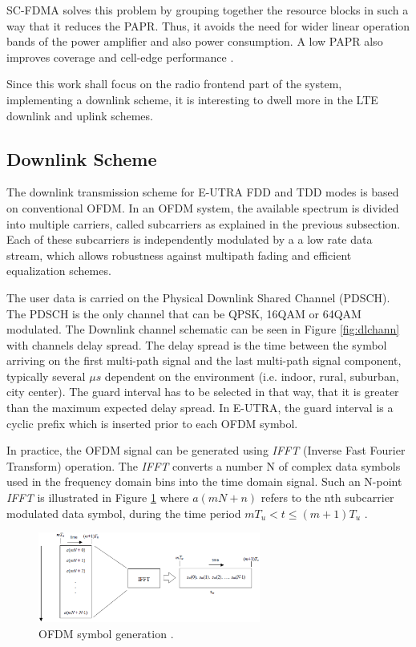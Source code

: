 SC-FDMA solves this problem by grouping together the resource blocks in such a
way that it reduces the PAPR. Thus, it avoids the need for wider linear
operation bands of the power amplifier and also power consumption. A low PAPR
also improves coverage and cell-edge performance \cite{introlte}.

Since this work shall focus on the radio frontend part of the system, implementing
a downlink scheme, it is interesting to dwell more in the LTE downlink and uplink
schemes.

\subsection{Downlink Scheme}%

The downlink transmission scheme for E-UTRA FDD and TDD modes is based on
conventional OFDM. In an OFDM system, the available spectrum is divided into
multiple carriers, called subcarriers as explained in the previous subsection.
Each of these subcarriers is independently modulated by a a low rate data
stream, which allows robustness against multipath fading and efficient
equalization schemes.

The user data is carried on the Physical Downlink Shared Channel (PDSCH). The
PDSCH is the only channel that can be QPSK, 16QAM or 64QAM modulated. The
Downlink channel schematic can be seen in Figure \ref{fig:dlchann} with channels
delay spread. The delay spread is the time between the symbol arriving on the
first multi-path signal and the last multi-path signal component, typically
several $\mu s$ dependent on the environment (i.e. indoor, rural, suburban, city
center). The guard interval has to be selected in that way, that it is greater
than the maximum expected delay spread. In E-UTRA, the guard interval is a
cyclic prefix which is inserted prior to each OFDM symbol.

In practice, the OFDM signal can be generated using \textit{IFFT} (Inverse Fast
Fourier Transform) operation. The \textit{IFFT} converts a number N of complex
data symbols used in the frequency domain bins into the time domain signal. Such
an N-point \textit{IFFT} is illustrated in Figure \ref{fig:ofdmsymbol} where
$a(mN+n)$ refers to the nth subcarrier modulated data symbol, during the time
period $mT_u < t \le (m+1)T_u$ \cite{umtslte}.

\begin{figure}[htbp]
    \centering
    \includegraphics[width=0.65\textwidth]{./figures/ofdm_symbol_gen}
    \caption{ OFDM symbol generation \cite{umtslte}.
    \label{fig:ofdmsymbol}}
\end{figure}

